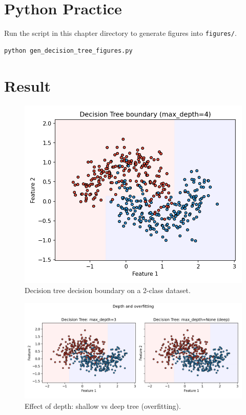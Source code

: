 \documentclass[11pt]{article}
\begin{document}
\section{Python Practice}
Run the script in this chapter directory to generate figures into \texttt{figures/}.
\begin{lstlisting}[style=code,caption={Generate Decision Tree figures},label={lst:genfigs_dt}]
python gen_decision_tree_figures.py
\end{lstlisting}

\section{Result}
\begin{figure}[H]
  \centering
  \includegraphics[width=0.9\linewidth]{dt_decision_boundary_2class.png}
  \caption{Decision tree decision boundary on a 2-class dataset.}
  \label{fig:dt2}
\end{figure}
\FloatBarrier

\begin{figure}[H]
  \centering
  \includegraphics[width=0.95\linewidth]{dt_depth_compare.png}
  \caption{Effect of depth: shallow vs deep tree (overfitting).}
  \label{fig:depth}
\end{figure}
\FloatBarrier
\end{document}
